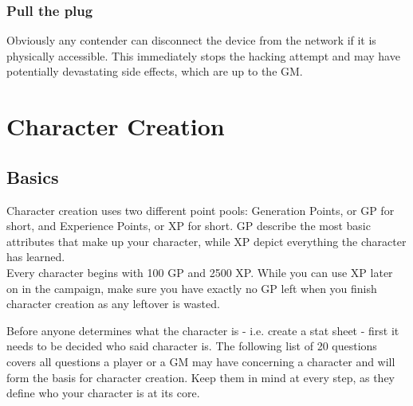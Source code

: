 \documentclass[12pt,a4paper,openany]{book}
\begin{document}
	\subsection*{Pull the plug}
	Obviously any contender can disconnect the device from the network if it is physically accessible. This immediately stops the hacking attempt and may have potentially devastating side effects, which are up to the GM.

	\chapter{Character Creation}
	\section{Basics}
	Character creation uses two different point pools: Generation Points, or GP for short, and Experience Points, or XP for short. GP describe the most basic attributes that make up your character, while XP depict everything the character has learned.\\
	Every character begins with 100 GP and 2500 XP. While you can use XP later on in the campaign, make sure you have exactly no GP left when you finish character creation as any leftover is wasted.

	Before anyone determines what the character is - i.e. create a stat sheet - first it needs to be decided who said character is. The following list of 20 questions covers all questions a player or a GM may have concerning a character and will form the basis for character creation. Keep them in mind at every step, as they define who your character is at its core.
\end{document}
